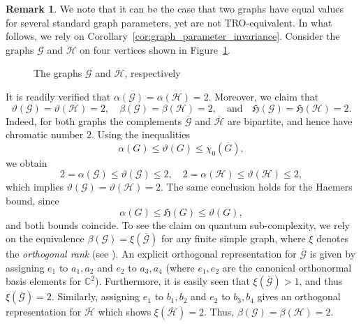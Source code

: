 \documentclass[11pt]{amsart}
\numberwithin{equation}{section}
\theoremstyle{plain}
\theoremstyle{definition}
\newtheorem{remark}[theorem]{Remark}
\theoremstyle{remark}
\newcommand{\G}{{\mathcal{G}}}
\renewcommand{\H}{{\mathcal{H}}}
\newcommand{\fH}{{\mathfrak{H}}}
\newcommand{\ol}{\overline}
\begin{document}
\begin{remark}
We note that it can be the case that two graphs have equal values for several standard graph parameters, yet are not TRO-equivalent. In what follows, we rely on Corollary~\ref{cor:graph_parameter_invariance}. 
Consider the graphs $\G$ and $\H$ on four vertices shown in Figure~\ref{fig:g1}. 
\begin{figure}[!ht]
\centering
{} 
\caption{The graphs $\G$ and $\H$, respectively}
\label{fig:g1}
\end{figure}

It is readily verified that $\alpha(\G)=\alpha(\H)=2$.
Moreover, we claim that
\[
\vartheta(\G)=\vartheta(\H)=2, \quad \beta(\mathcal{G}) = \beta(\mathcal{H}) = 2, \quad \text{and} \quad \fH(\G)=\fH(\H)=2.
\]
Indeed, for both graphs the complements $\ol{\G}$ and $\ol{\H}$ are bipartite, and hence have chromatic number $2$. Using the inequalities
\[
\alpha(G)\le \vartheta(G)\le \chi_0(\ol{G}),
\]
we obtain
\[
2=\alpha(\G)\le \vartheta(\G)\le 2,
\quad 
2=\alpha(\H)\le \vartheta(\H)\le 2,
\]
which implies $\vartheta(\G)=\vartheta(\H)=2$. The same conclusion holds for the Haemers bound, since
\[
\alpha(G)\le \fH(G)\le \vartheta(G),
\]
and both bounds coincide. To see the claim on quantum sub-complexity, we rely on the equivalence $\beta(\mathcal{G}) = \xi(\ol{\mathcal{G}})$ for any finite simple graph, where $\xi$ denotes the \textit{orthogonal rank} (see \cite{SS12}). An explicit orthogonal representation for $\ol{\mathcal{G}}$ is given by assigning $e_{1}$ to $a_{1}, a_{2}$ and $e_{2}$ to $a_{3}, a_{4}$ (where $e_{1}, e_{2}$ are the canonical orthonormal basis elements for $\mathbb{C}^{2}$). Furthermore, it is easily seen that $\xi(\ol{\mathcal{G}}) > 1$, and thus $\xi(\ol{\mathcal{G}}) = 2$. Similarly, assigning $e_{1}$ to $b_{1}, b_{2}$ and $e_{2}$ to $b_{3}, b_{4}$ gives an orthogonal representation for $\ol{\mathcal{H}}$ which shows $\xi(\ol{\mathcal{H}}) = 2$. Thus, $\beta(\mathcal{G}) = \beta(\mathcal{H}) = 2$. 


\end{remark}
\end{document}
